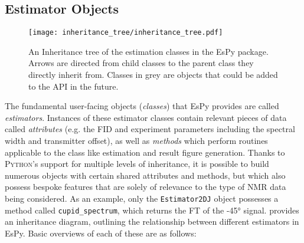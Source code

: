 \subsection{Estimator Objects}
\label{subsec:estimator-objects}
\begin{figure}
    \centering
    \texttt{[image: inheritance\_tree/inheritance\_tree.pdf]}
    \caption[
        An inheritance tree of the estimation classes in the \acs{EsPy} package.
    ]{
        An Inheritance tree of the estimation classes in the \acs{EsPy} package.
        Arrows are directed from child classes to the parent class they
        directly inherit from. Classes in grey are objects that could be added
        to the \ac{API} in the future.
    }
    \label{fig:inheritance}
\end{figure}
The fundamental user-facing objects (\emph{classes}) that \ac{EsPy} provides are
called \emph{estimators}.
Instances of these estimator classes contain relevant pieces of data called
\emph{attributes} (e.g. the \ac{FID} and experiment parameters including the
spectral width and transmitter offset), as well as \emph{methods} which perform
routines applicable to the class like estimation and result figure generation.
Thanks to \textsc{Python}'s support for multiple levels of inheritance, it is
possible to build numerous objects with certain shared attributes and methods,
but which also possess bespoke features that are solely of relevance to
the type of \ac{NMR} data being considered. As an example, only the
\texttt{Estimator2DJ} object possesses a method called \texttt{cupid\_spectrum},
which returns the \ac{FT} of the \ang{-45} signal.
 provides an inheritance
diagram, outlining the relationship between different estimators in
\ac{EsPy}. Basic overviews of each of these are as follows:
